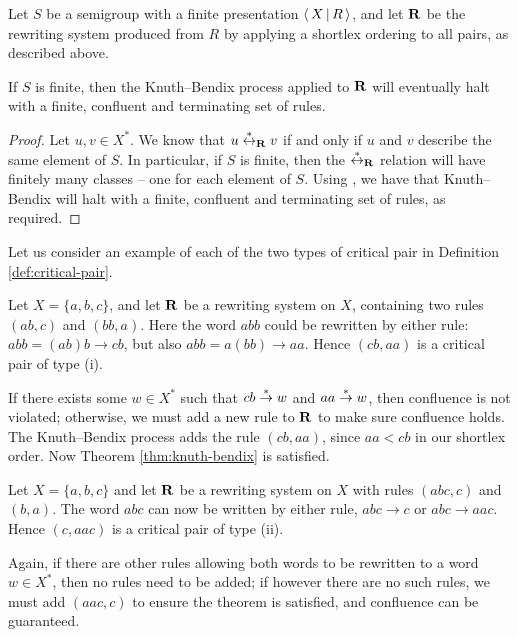 \begin{theorem}
  Let $S$ be a semigroup with a finite presentation $\left\langle\,X\,\middle|\,R\,\right\rangle$, and let $\mathbf{R}$
  be the rewriting system produced from $R$ by applying a shortlex ordering to
  all pairs, as described above.

  If $S$ is finite, then the Knuth--Bendix process applied to $\mathbf{R}$ will
  eventually halt with a finite, confluent and terminating set of rules.

  \begin{proof}
    Let $u,v \in X^*$.  We know that $u \stackrel{*}{\leftrightarrow}_{\mathbf{R}} v$ if and only if $u$ and
    $v$ describe the same element of $S$.  In particular, if $S$ is finite, then
    the $\stackrel{*}{\leftrightarrow}_{\mathbf{R}}$ relation will have finitely many classes -- one for each
    element of $S$.  Using \cite[Corollary 12.21]{cgt}, we have that
    Knuth--Bendix will halt with a finite, confluent and terminating set of
    rules, as required.
  \end{proof}
\end{theorem}

Let us consider an example of each of the two types of critical pair in
Definition \ref{def:critical-pair}.

\begin{example}
  Let $X=\{a,b,c\}$, and let $\mathbf{R}$ be a rewriting system on $X$, containing
  two rules $(ab, c)$ and $(bb, a)$.  Here the word $abb$ could be
  rewritten by either rule: $abb = (ab)b \to cb$, but also
  $abb = a(bb) \to aa$.  Hence $(cb, aa)$ is a critical pair of type (i).

  If there exists some $w \in X^*$ such that $cb \stackrel{*}{\to} w$ and $aa \stackrel{*}{\to} w$,
  then confluence is not violated; otherwise, we must add a new rule to $\mathbf{R}$
  to make sure confluence holds.  The Knuth--Bendix process adds the rule
  $(cb, aa)$, since $aa < cb$ in our shortlex order.  Now Theorem
  \ref{thm:knuth-bendix} is satisfied.
\end{example}

\begin{example}
  Let $X=\{a,b,c\}$ and let $\mathbf{R}$ be a rewriting system on $X$ with rules
  $(abc, c)$ and $(b, a)$.  The word $abc$ can now be written by either rule,
  $abc \to c$ or $abc \to aac$.  Hence $(c, aac)$ is a critical pair of type
  (ii).

  Again, if there are other rules allowing both words to be rewritten to a word
  $w \in X^*$, then no rules need to be added; if however there are no such
  rules, we must add $(aac, c)$ to ensure the theorem is satisfied, and
  confluence can be guaranteed.
\end{example}

